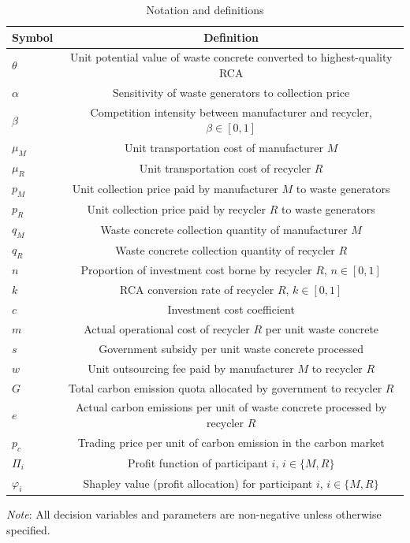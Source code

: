 \documentclass[authoryear,preprint,review,times,10pt]{elsarticle}
\begin{document}
\begin{table}[!htbp]
\centering
\captionsetup{font=normalsize, labelsep=period}
\caption{Notation and definitions}
\label{tab:notation}
\small
\begin{threeparttable}
\begin{tabular*}{0.9\textwidth}{@{\extracolsep{\fill}}lc}
\toprule
\textbf{Symbol} & \textbf{Definition} \\
\midrule
$\theta$ & Unit potential value of waste concrete converted to highest-quality RCA \\
$\alpha$ & Sensitivity of waste generators to collection price \\
$\beta$ & Competition intensity between manufacturer and recycler, $\beta \in [0,1]$ \\
$\mu_M$ & Unit transportation cost of manufacturer $M$ \\
$\mu_R$ & Unit transportation cost of recycler $R$ \\
$p_M$ & Unit collection price paid by manufacturer $M$ to waste generators \\
$p_R$ & Unit collection price paid by recycler $R$ to waste generators \\
$q_M$ & Waste concrete collection quantity of manufacturer $M$ \\
$q_R$ & Waste concrete collection quantity of recycler $R$ \\
$n$ & Proportion of investment cost borne by recycler $R$, $n \in [0,1]$ \\
$k$ & RCA conversion rate of recycler $R$, $k \in [0,1]$ \\
$c$ & Investment cost coefficient \\
$m$ & Actual operational cost of recycler $R$ per unit waste concrete \\
$s$ & Government subsidy per unit waste concrete processed \\
$w$ & Unit outsourcing fee paid by manufacturer $M$ to recycler $R$ \\
$G$ & Total carbon emission quota allocated by government to recycler $R$ \\
$e$ & Actual carbon emissions per unit of waste concrete processed by recycler $R$ \\
$p_c$ & Trading price per unit of carbon emission in the carbon market \\
$\Pi_i$ & Profit function of participant $i$, $i \in \{M,R\}$ \\
$\varphi_i$ & Shapley value (profit allocation) for participant $i$, $i \in \{M,R\}$ \\
\bottomrule
\end{tabular*}
\begin{tablenotes}[flushleft]
\small\linespread{1}\selectfont
\item \textit{Note}: All decision variables and parameters are non-negative unless otherwise specified.
\end{tablenotes}
\end{threeparttable}
\end{table}
\vspace{10pt}
\normalsize
\end{document}
